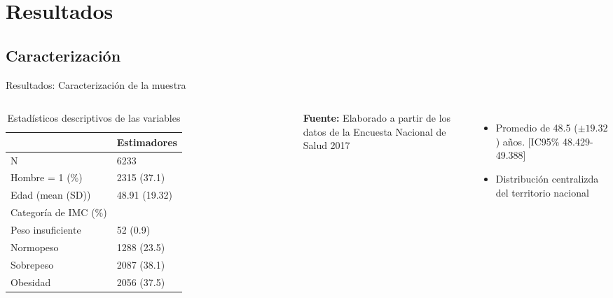 \documentclass[aspectratio=169]{beamer}
\newcommand{\pro}{\item [$\blacktriangleright$]}
\begin{document}
\section{Resultados}

\subsection*{Caracterización}
\begin{frame}{Resultados: Caracterización de la muestra}
        \begin{columns}[onlytextwidth]
\begin{table}{}
\caption{Estadísticos descriptivos de las variables}
    \centering
    \small
\begin{tabular}{l l}
\toprule
  & Estimadores \\
\midrule
N & 6233\\
Hombre = 1 (\%) & 2315 (37.1)\\
Edad (mean (SD)) & 48.91 (19.32)\\
Categoría de IMC (\%) & \\
\-\hspace{5mm} \small Peso insuficiente & 52 (0.9)\\
\-\hspace{5mm} \small Normopeso & 1288 (23.5)\\
\-\hspace{5mm} \small Sobrepeso & 2087 (38.1)\\
\-\hspace{5mm} \small Obesidad & 2056 (37.5)\\
\bottomrule
\end{tabular}
    \vspace{1ex}
    
    {\raggedright \small \textbf{Fuente:} Elaborado a partir de los datos de la Encuesta Nacional de Salud 2017 \par}
\end{table}
    \begin{itemize}
        \pro Promedio de 48.5 ($\pm 19.32$) años. [IC95\% 48.429-49.388]
        \pro Distribución centralizda del territorio nacional
    \end{itemize}
    \end{columns}
\end{frame}
\end{document}
